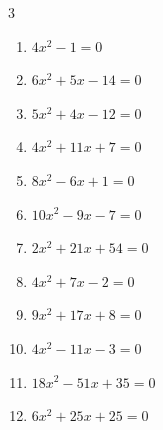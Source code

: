 \begin{multicols}{3}
\begin{enumerate}

  \item $4x^{2}-1=0$


  \item $6x^{2}+5x-14=0$


  \item $5x^{2}+4x-12=0$


\columnbreak %

  \item $4x^{2}+11x+7=0$


  \item $8x^{2}-6x+1=0$


  \item $10x^{2}-9x-7=0$


  \item $2x^{2}+21x+54=0$


  \item $4x^{2}+7x-2=0$


  \item $9x^{2}+17x+8=0$


  \item $4x^{2}-11x-3=0$


  \item $18x^{2}-51x+35=0$


  \item $6x^{2}+25x+25=0$



\end{enumerate}
\end{multicols}
